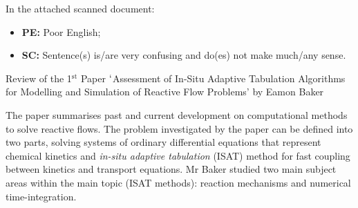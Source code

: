 \documentclass[14pt,twoside]{report}
\begin{document}
In the attached scanned document:
\begin{itemize}
\item {\bf PE:} Poor English;
\item {\bf SC:} Sentence(s) is/are very confusing and do(es) not make much/any sense.   
\end{itemize}

\clearpage



\bigskip

\begin{center}
  {\Large Review of the 1$^{\text{st}}$ Paper $\lq$Assessment of In-Situ Adaptive Tabulation Algorithms for Modelling and Simulation of Reactive Flow Problems' by Eamon Baker}
\end{center}
The paper summarises past and current development on computational methods to solve reactive flows. The problem investigated by the paper can be defined into two parts, solving systems of ordinary differential equations that represent chemical kinetics and {\it in-situ adaptive tabulation} (ISAT) method for fast coupling between kinetics and transport equations. Mr Baker studied two main subject areas within the main topic (ISAT methods): reaction mechanisms and numerical time-integration.
\end{document}
